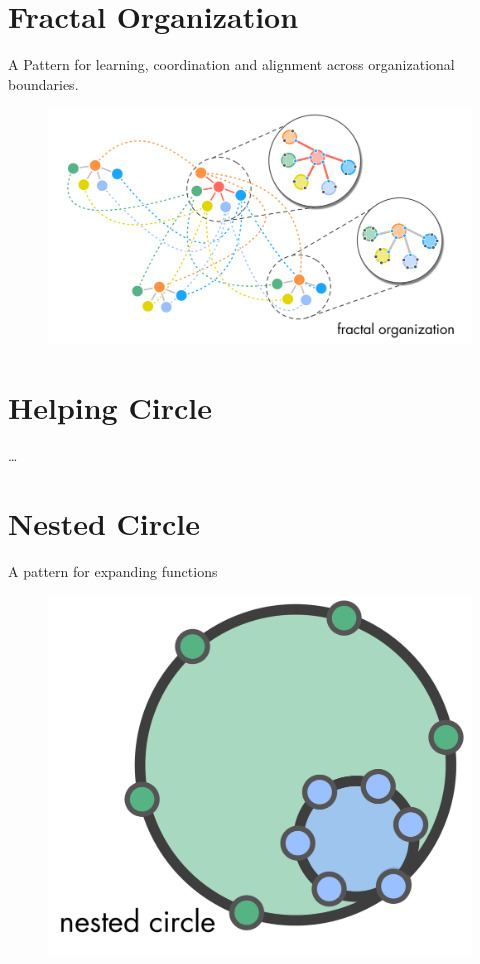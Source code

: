 \section{Fractal Organization}
\label{fractalorganization}

A Pattern for learning, coordination and alignment across organizational boundaries.

\begin{figure}[htbp]
\centering
\includegraphics[keepaspectratio,width=\textwidth,height=0.75\textheight]{img/structural-patterns/fractal-organization.png}
\end{figure}

\section{Helping Circle}
\label{helpingcircle}

{\ldots}

\section{Nested Circle}
\label{nestedcircle}

A pattern for expanding functions

\begin{figure}[htbp]
\centering
\includegraphics[keepaspectratio,width=\textwidth,height=0.75\textheight]{img/structural-patterns/nested-circle.png}
\end{figure}

